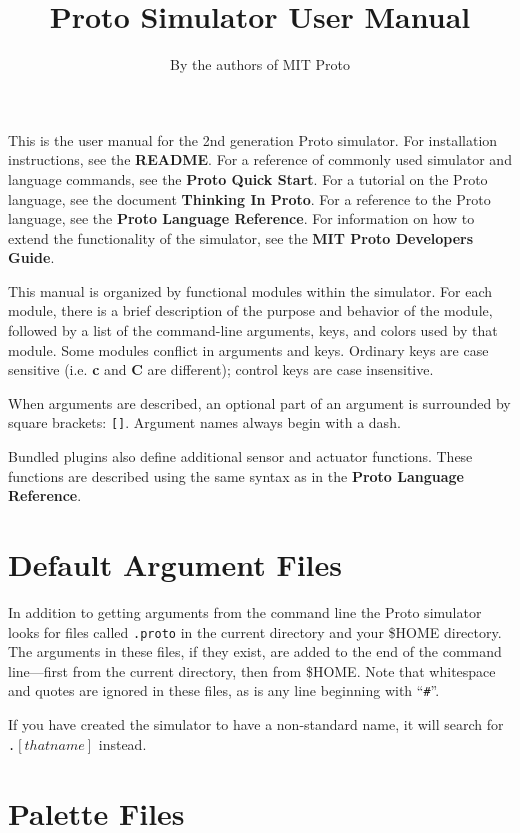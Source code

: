 \documentclass{article}
\title{Proto Simulator User Manual}
\author{By the authors of MIT Proto}
\date{\releasetag}
\newcommand\var[1]{{\tt #1}}
\newcommand\key[1]{{\bf #1}}
\begin{document}
\maketitle

This is the user manual for the 2nd generation Proto simulator.  For
installation instructions, see the {\bf README}.  For
a reference of commonly used simulator and language commands, see the
{\bf Proto Quick Start}.  For a tutorial on the Proto language, see
the document {\bf Thinking In Proto}.  For a reference to the Proto
language, see the {\bf Proto Language Reference}.  For information on
how to extend the functionality of the simulator, see the {\bf MIT Proto
Developers Guide}.

This manual is organized by functional modules within the simulator.
For each module, there is a brief description of the purpose and
behavior of the module, followed by a list of the command-line
arguments, keys, and colors used by that module.  Some modules
conflict in arguments and keys.  Ordinary keys are case sensitive
(i.e.  \key{c} and \key{C} are different); control keys are case
insensitive.

When arguments are described, an optional part of an argument is
surrounded by square brackets: \var{[]}.  Argument names always begin
with a dash.

Bundled plugins also define additional sensor and actuator functions.
These functions are described using the same syntax as in the {\bf
  Proto Language Reference}.


\credits{}

\section{Default Argument Files}

In addition to getting arguments from the command line the Proto
simulator looks for files called \var{.proto} in the current directory
and your \$HOME directory.  The arguments in these files, if they
exist, are added to the end of the command line---first from the
current directory, then from \$HOME.  Note that whitespace and quotes
are ignored in these files, as is any line beginning with ``\var{\#}''.

If you have created the simulator to have a non-standard name, it 
will search for \var{.}$[that name]$ instead.

\section{Palette Files}
\end{document}
